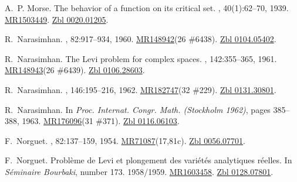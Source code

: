 \documentclass[11pt,a4paper, final, twoside]{article}
\numberwithin{equation}{section}
\begin{document}
\begin{appendices}
\begin{thebibliography}{100}
A.~P. Morse.
\newblock The behavior of a function on its critical set.
, 40(1):62--70, 1939.
\newblock \href{http://www.ams.org/mathscinet-getitem?mr=1503449}{MR1503449}.
  \href{http://zbmath.org/?q=an:0020.01205}{Zbl 0020.01205}.

R.~Narasimhan.
, 82:917--934, 1960.
\newblock \href{http://www.ams.org/mathscinet-getitem?mr=148942}{MR148942}(26
  \#6438). \href{http://zbmath.org/?q=an:0104.05402}{Zbl 0104.05402}.

R.~Narasimhan.
\newblock The {L}evi problem for complex spaces.
, 142:355--365, 1961.
\newblock \href{http://www.ams.org/mathscinet-getitem?mr=148943}{MR148943}(26
  \#6439). \href{http://zbmath.org/?q=an:0106.28603}{Zbl 0106.28603}.

R.~Narasimhan.
, 146:195--216, 1962.
\newblock \href{http://www.ams.org/mathscinet-getitem?mr=182747}{MR182747}(32
  \#229). \href{http://zbmath.org/?q=an:0131.30801}{Zbl 0131.30801}.

R.~Narasimhan.
\newblock In {\em {Proc. Internat. Congr. Math. (Stockholm 1962)}}, pages
  385--388, 1963.
\newblock \href{http://www.ams.org/mathscinet-getitem?mr=176096}{MR176096}(31
  \#371). \href{http://zbmath.org/?q=an:0116.06103}{Zbl 0116.06103}.

F.~Norguet.
,
  82:137--159, 1954.
\newblock
  \href{http://www.ams.org/mathscinet-getitem?mr=71087}{MR71087}(17,81c).
  \href{http://zbmath.org/?q=an:0056.07701}{Zbl 0056.07701}.

F.~Norguet.
\newblock Probl\`eme de {L}evi et plongement des vari\'et\'es analytiques
  r\'eelles.
\newblock In {\em S\'eminaire {B}ourbaki}, number 173. 1958/1959.
\newblock \href{http://www.ams.org/mathscinet-getitem?mr=1603458}{MR1603458}.
  \href{http://zbmath.org/?q=an:0128.07801}{Zbl 0128.07801}.


\end{thebibliography}
\end{appendices}
\end{document}
